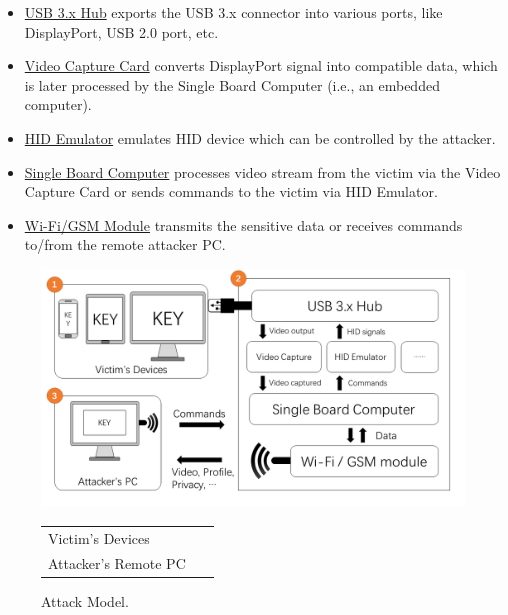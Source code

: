 \begin{itemize}

	\item\underline{USB 3.x Hub} exports the \ac{USB} 3.x connector into various ports, like DisplayPort, \ac{USB} 2.0 port, etc.

	\item\underline{Video Capture Card} converts DisplayPort signal into compatible data, which is later processed by the Single Board Computer (i.e., an embedded computer).

	\item\underline{\ac{HID} Emulator} emulates \ac{HID} device which can be controlled by the attacker.

	\item\underline{Single Board Computer} processes video stream from the victim via the Video Capture Card or sends commands to the victim via \ac{HID} Emulator.

	\item\underline{Wi-Fi/GSM Module} transmits the sensitive data or receives commands to/from the remote attacker PC.

\end{itemize}


\begin{figure}[t]
	\centering
	\includegraphics[width=\linewidth]{./Figs/attack_model.png}

	\begin{tabular}{ll}
	\circled[text=white,fill=myyellow]{\footnotesize{1}} Victim's Devices    &\circled[text=white,fill=myyellow]{\footnotesize{2}}~\tool\\
	\circled[text=white,fill=myyellow]{\footnotesize{3}} Attacker's Remote PC
	\end{tabular}

	\caption{Attack Model.}%
	\label{fig:attack_model}
\end{figure}

